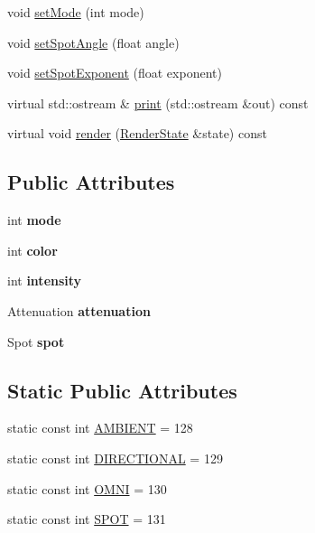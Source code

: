 \begin{CompactItemize}
\item 
void \hyperlink{classm3g_1_1Light_9f407b18ba6235cb96fa95611c1ea3a4}{setMode} (int mode)
\item 
void \hyperlink{classm3g_1_1Light_30ce206b37f6ed5e918fbc75b3f91072}{setSpotAngle} (float angle)
\item 
void \hyperlink{classm3g_1_1Light_787eb66801e17d0412559598326ce19d}{setSpotExponent} (float exponent)
\item 
virtual std::ostream \& \hyperlink{classm3g_1_1Light_6fea17fa1532df3794f8cb39cb4f911f}{print} (std::ostream \&out) const 
\item 
virtual void \hyperlink{classm3g_1_1Light_8babc8a79b78615da51161e94029eea9}{render} (\hyperlink{structm3g_1_1RenderState}{RenderState} \&state) const 
\end{CompactItemize}
\subsection*{Public Attributes}
\begin{CompactItemize}
\item 
\hypertarget{classm3g_1_1Light_1ea5d0cb93f22f7d0fdf804bd68c3326}{
int \textbf{mode}}
\label{classm3g_1_1Light_1ea5d0cb93f22f7d0fdf804bd68c3326}

\item 
\hypertarget{classm3g_1_1Light_0fd02fb9277ffcb35a75066ffe95e8c7}{
int \textbf{color}}
\label{classm3g_1_1Light_0fd02fb9277ffcb35a75066ffe95e8c7}

\item 
\hypertarget{classm3g_1_1Light_299ec0c42ccc5a2d79d1739428ac3210}{
int \textbf{intensity}}
\label{classm3g_1_1Light_299ec0c42ccc5a2d79d1739428ac3210}

\item 
\hypertarget{classm3g_1_1Light_1569207c73e72f9b3ceeaba71b985378}{
Attenuation \textbf{attenuation}}
\label{classm3g_1_1Light_1569207c73e72f9b3ceeaba71b985378}

\item 
\hypertarget{classm3g_1_1Light_8c48692471265603559309c9b2fd65a1}{
Spot \textbf{spot}}
\label{classm3g_1_1Light_8c48692471265603559309c9b2fd65a1}

\end{CompactItemize}
\subsection*{Static Public Attributes}
\begin{CompactItemize}
\item 
static const int \hyperlink{classm3g_1_1Light_4cf648a82d9de62a1fb15f4277049594}{AMBIENT} = 128
\item 
static const int \hyperlink{classm3g_1_1Light_a2fb668ca8bbeb8323eda98fba594fda}{DIRECTIONAL} = 129
\item 
static const int \hyperlink{classm3g_1_1Light_34d360bb8395ad7fbcd3ec286ece64cb}{OMNI} = 130
\item 
static const int \hyperlink{classm3g_1_1Light_c44aef16b96dc8fd8b134416964a7de9}{SPOT} = 131
\end{CompactItemize}


